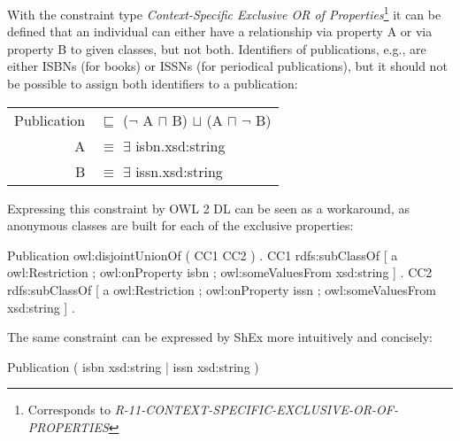 \documentclass{llncs}
\newcommand{\ms}[1]{\texttt{#1}}
\newenvironment{DL}{
  \vspace{0cm}
  \begin{tabular}{r l}

}{
  \end{tabular}
}
\begin{document}
%
%
%
With the constraint type {\em Context-Specific Exclusive OR of Properties}\footnote{Corresponds to {\em R-11-CONTEXT-SPECIFIC-EXCLUSIVE-OR-OF-PROPERTIES}} 
it can be defined that an individual can either have a relationship via property A or via property B to given classes, but not both.
Identifiers of publications, e.g., are either ISBNs (for books) or ISSNs (for periodical publications), but it should not be possible to assign both identifiers to a publication:
\begin{center}
\begin{DL}
Publication &$\sqsubseteq$ ($\neg$ A $\sqcap$ B) $\sqcup$ (A $\sqcap$ $\neg$ B) \\
A &$\equiv$ $\exists$ isbn.xsd:string \\
B &$\equiv$ $\exists$ issn.xsd:string \\ 
\end{DL} 
\end{center}
Expressing this constraint by OWL 2 DL can be seen as a workaround, 
as anonymous classes are built for each of the exclusive properties:
\begin{ex}
Publication owl:disjointUnionOf ( CC1 CC2 ) . 
CC1 rdfs:subClassOf [
    a owl:Restriction ;
    owl:onProperty isbn ;
    owl:someValuesFrom xsd:string ] .
CC2 rdfs:subClassOf [
    a owl:Restriction ;
    owl:onProperty issn ;
    owl:someValuesFrom xsd:string ] .
\end{ex}
The same constraint can be expressed by ShEx more intuitively and concisely:
\begin{ex}
Publication { (  
    isbn xsd:string | issn xsd:string ) }
\end{ex}
\end{document}
